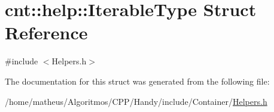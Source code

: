 \hypertarget{structcnt_1_1help_1_1IterableType}{}\section{cnt\+:\+:help\+:\+:Iterable\+Type Struct Reference}
\label{structcnt_1_1help_1_1IterableType}


{\ttfamily \#include $<$Helpers.\+h$>$}



The documentation for this struct was generated from the following file\+:\begin{DoxyCompactItemize}
\item 
/home/matheus/\+Algoritmos/\+C\+P\+P/\+Handy/include/\+Container/\hyperlink{Container_2Helpers_8h}{Helpers.\+h}\end{DoxyCompactItemize}

